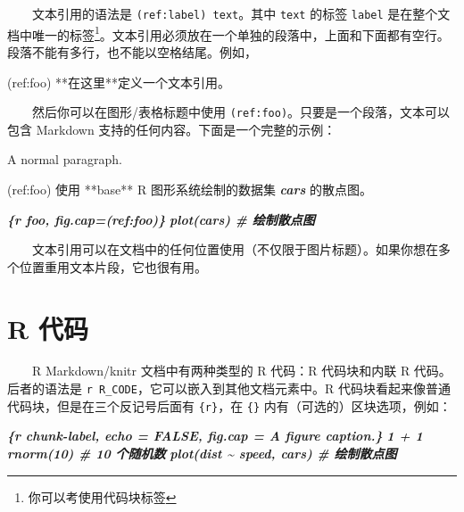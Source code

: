 \documentclass[
  12pt,
]{krantz}
\newenvironment{Shaded}{\begin{snugshade}}{\end{snugshade}}
\newcommand{\InformationTok}[1]{\textcolor[rgb]{0.56,0.35,0.01}{\textbf{\textit{#1}}}}
\newcommand{\NormalTok}[1]{#1}
\theoremstyle{definition}
\theoremstyle{definition}
\theoremstyle{definition}
\theoremstyle{definition}
\theoremstyle{remark}
\begin{document}
  文本引用的语法是 \texttt{(ref:label)\ text}。其中 \texttt{text} 的标签 \texttt{label} 是在整个文档中唯一的标签\footnote{你可以考使用代码块标签}。文本引用必须放在一个单独的段落中，上面和下面都有空行。段落不能有多行，也不能以空格结尾。例如，

\begin{Shaded}
\begin{Highlighting}[]
\NormalTok{(ref:foo) **在这里**定义一个文本引用。}
\end{Highlighting}
\end{Shaded}

  然后你可以在图形/表格标题中使用 \texttt{(ref:foo)}。只要是一个段落，文本可以包含 Markdown 支持的任何内容。下面是一个完整的示例：

\begin{Shaded}
\begin{Highlighting}[]
\NormalTok{A normal paragraph.}

\NormalTok{(ref:foo) 使用 **base** R 图形系统绘制的数据集 }\InformationTok{\textasciigrave{}cars\textasciigrave{}}\NormalTok{ 的散点图。}

\InformationTok{\textasciigrave{}\textasciigrave{}\textasciigrave{}\{r foo, fig.cap=\textquotesingle{}(ref:foo)\textquotesingle{}\}}
\InformationTok{plot(cars)  \# 绘制散点图}
\InformationTok{\textasciigrave{}\textasciigrave{}\textasciigrave{}}
\end{Highlighting}
\end{Shaded}

  文本引用可以在文档中的任何位置使用（不仅限于图片标题）。如果你想在多个位置重用文本片段，它也很有用。

\hypertarget{r-code}{%
\section{R 代码}\label{r-code}}

  R Markdown/knitr 文档中有两种类型的 R 代码：R 代码块和内联 R 代码。后者的语法是 \texttt{\textasciigrave{}r\ R\_CODE\textasciigrave{}}，它可以嵌入到其他文档元素中。R 代码块看起来像普通代码块，但是在三个反记号后面有 \texttt{\{r\}}，在 \texttt{\{\}} 内有（可选的）区块选项，例如：

\begin{Shaded}
\begin{Highlighting}[]
\InformationTok{\textasciigrave{}\textasciigrave{}\textasciigrave{}\{r chunk{-}label, echo = FALSE, fig.cap = \textquotesingle{}A figure caption.\textquotesingle{}\}}
\InformationTok{1 + 1}
\InformationTok{rnorm(10)  \# 10 个随机数}
\InformationTok{plot(dist \textasciitilde{} speed, cars)  \# 绘制散点图}
\InformationTok{\textasciigrave{}\textasciigrave{}\textasciigrave{}}
\end{Highlighting}
\end{Shaded}
\end{document}

